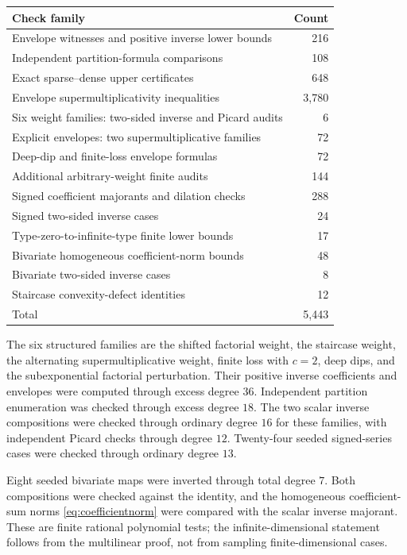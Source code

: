\documentclass[11pt,a4paper]{article}
\numberwithin{equation}{section}
\theoremstyle{definition}
\theoremstyle{remark}
\begin{document}
\begin{center}
\small
\begin{tabular}{@{}p{}r@{}}
\toprule
Check family & Count\\
\midrule
Envelope witnesses and positive inverse lower bounds & 216\\
Independent partition-formula comparisons & 108\\
Exact sparse--dense upper certificates & 648\\
Envelope supermultiplicativity inequalities & 3,780\\
Six weight families: two-sided inverse and Picard audits & 6\\
Explicit envelopes: two supermultiplicative families & 72\\
Deep-dip and finite-loss envelope formulas & 72\\
Additional arbitrary-weight finite audits & 144\\
Signed coefficient majorants and dilation checks & 288\\
Signed two-sided inverse cases & 24\\
Type-zero-to-infinite-type finite lower bounds & 17\\
Bivariate homogeneous coefficient-norm bounds & 48\\
Bivariate two-sided inverse cases & 8\\
Staircase convexity-defect identities & 12\\
\midrule
Total & 5,443\\
\bottomrule
\end{tabular}
\end{center}

The six structured families are the shifted factorial weight, the
staircase weight, the alternating supermultiplicative weight, finite loss
with $c=2$, deep dips, and the subexponential factorial perturbation.
Their positive inverse coefficients and envelopes were computed through
excess degree $36$. Independent partition enumeration was checked
through excess degree $18$. The two scalar inverse compositions were
checked through ordinary degree $16$ for these families, with independent
Picard checks through degree $12$. Twenty-four seeded signed-series
cases were checked through ordinary degree $13$.

Eight seeded bivariate maps were inverted through total degree $7$.
Both compositions were checked against the identity, and the homogeneous
coefficient-sum norms \eqref{eq:coefficientnorm} were compared with the
scalar inverse majorant. These are finite rational polynomial tests;
the infinite-dimensional statement follows from the multilinear proof,
not from sampling finite-dimensional cases.
\end{document}
